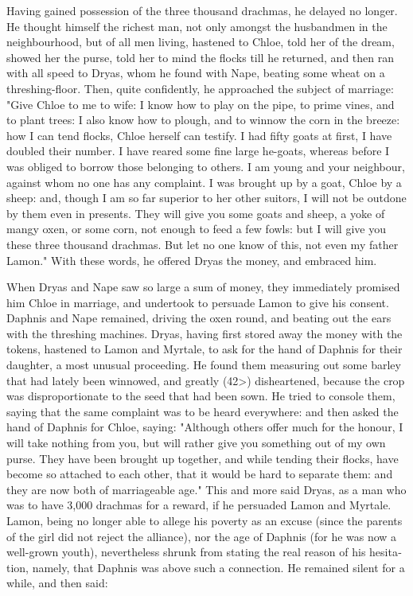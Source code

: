 \documentclass{book}
\begin{document}
\begin{pairs}
\begin{Rightside}
\begin{english}
  Having gained possession of the three thousand drachmas, he delayed no longer.  He thought himself the richest man, not only amongst the husbandmen in the neighbourhood, but of all men living, hastened to Chloe, told her of the dream, showed her the purse, told her to mind the flocks till he returned, and then ran with all speed to Dryas, whom he found with Nape, beating some wheat on a threshing-floor.  Then, quite confidently, he approached the subject of marriage: "Give Chloe to me to wife: I know how to play on the pipe, to prime vines, and to plant trees: I also know how to plough, and to winnow the corn in the breeze: how I can tend flocks, Chloe herself can testify.  I had fifty goats at first, I have doubled their number.  I have reared some fine large he-goats, whereas before I was obliged to borrow those belonging to others.  I am young and your neighbour, against whom no one has any complaint.  I was brought up by a goat, Chloe by a sheep: and, though I am so far superior to her other suitors, I will not be outdone by them even in presents.  They will give you some goats and sheep, a yoke of mangy oxen, or some corn, not enough to feed a few fowls: but I will give you these three thousand drachmas.  But let no one know of this, not even my father Lamon."  With these words, he offered Dryas the money, and embraced him.
\pend


  When Dryas and Nape saw so large a sum of money, they immediately promised him Chloe in marriage, and undertook to persuade Lamon to give his consent.  Daphnis and Nape remained, driving the oxen round, and beating out the ears with the threshing machines.  Dryas, having first stored away the money with the tokens, hastened to Lamon and Myrtale, to ask for the hand of Daphnis for their daughter, a most unusual proceeding.  He found them measuring out some barley that had lately been winnowed, and greatly (42>) disheartened, because the crop was disproportionate to the seed that had been sown.  He tried to console them, saying that the same complaint was to be heard everywhere: and then asked the hand of Daphnis for Chloe, saying: "Although others offer much for the honour, I will take nothing from you, but will rather give you something out of my own purse.  They have been brought up together, and while tending their flocks, have become so attached to each other, that it would be hard to separate them: and they are now both of marriageable age."  This and more said Dryas, as a man who was to have 3,000 drachmas for a reward, if he persuaded Lamon and Myrtale.  Lamon, being no longer able to allege his poverty as an excuse (since the parents of the girl did not reject the alliance), nor the age of Daphnis (for he was now a well-grown youth), nevertheless shrunk from stating the real reason of his hesitation, namely, that Daphnis was above such a connection.  He remained silent for a while, and then said:
\pend



\end{english}
\end{Rightside}
\end{pairs}
\end{document}
